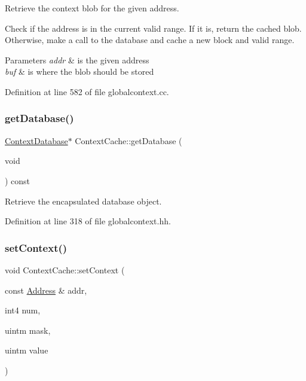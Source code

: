 Retrieve the context blob for the given address. 

Check if the address is in the current valid range. If it is, return the cached blob. Otherwise, make a call to the database and cache a new block and valid range. 
\begin{DoxyParams}{Parameters}
{\em addr} & is the given address \\
\hline
{\em buf} & is where the blob should be stored \\
\hline
\end{DoxyParams}


Definition at line 582 of file globalcontext.\+cc.

\mbox{\label{class_context_cache_a4b722a698726c2f634a50c5b0af70c38}} 
\subsubsection{\texorpdfstring{getDatabase()}{getDatabase()}}
{\footnotesize\ttfamily \mbox{\hyperlink{class_context_database}{Context\+Database}}$\ast$ Context\+Cache\+::get\+Database (\begin{DoxyParamCaption}\item[{void}]{ }\end{DoxyParamCaption}) const\hspace{0.3cm}{\ttfamily [inline]}}



Retrieve the encapsulated database object. 



Definition at line 318 of file globalcontext.\+hh.

\mbox{\label{class_context_cache_ac9f411a6a52bed3b3e59607371766c8b}} 
\subsubsection{\texorpdfstring{setContext()}{setContext()}\hspace{0.1cm}{\footnotesize\ttfamily [1/2]}}
{\footnotesize\ttfamily void Context\+Cache\+::set\+Context (\begin{DoxyParamCaption}\item[{const \mbox{\hyperlink{class_address}{Address}} \&}]{addr,  }\item[{int4}]{num,  }\item[{uintm}]{mask,  }\item[{uintm}]{value }\end{DoxyParamCaption})}



